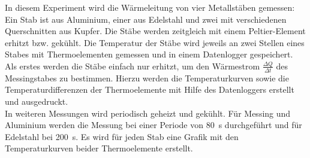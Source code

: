 In diesem Experiment wird die Wärmeleitung von vier Metallstäben gemessen: Ein Stab ist aus Aluminium, einer aus Edelstahl und zwei mit verschiedenen Querschnitten aus Kupfer.
Die Stäbe werden zeitgleich mit einem Peltier-Element erhitzt bzw. gekühlt. Die Temperatur der Stäbe wird jeweils an zwei Stellen eines Stabes mit Thermoelementen gemessen und in einem Datenlogger gespeichert. \\
Als erstes werden die Stäbe einfach nur erhitzt, um den Wärmestrom $\frac{\Delta Q}{\Delta t}$ des Messingstabes zu bestimmen. Hierzu werden die Temperaturkurven sowie die Temperaturdifferenzen der Thermoelemente mit Hilfe des Datenloggers erstellt und ausgedruckt. \\
In weiteren Messungen wird periodisch geheizt und gekühlt. Für Messing und Aluminium werden die Messung bei einer Periode von \SI{80}{\second} durchgeführt und für Edelstahl bei  \SI{200}{\second}. Es wird für jeden Stab eine Grafik mit den Temperaturkurven beider Thermoelemente erstellt.

